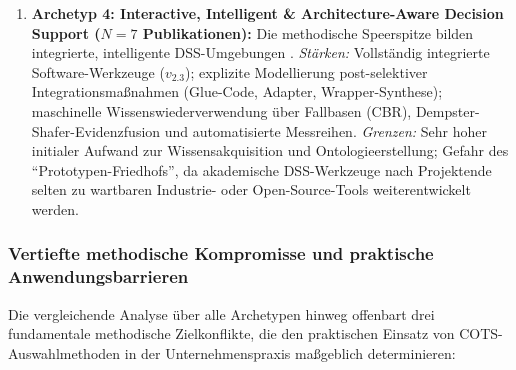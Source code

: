 \begin{enumerate}[label=\textbf{\arabic*.}, leftmargin=*]
  \item \textbf{Archetyp 4: Interactive, Intelligent \& Architecture-Aware Decision Support ($N = 7$ Publikationen):}  
  Die methodische Speerspitze bilden integrierte, intelligente DSS-Umgebungen \parencite[Dazu gehören:][]{QDUNCXFC, 6RNULWVY, 9F79VAAB, 8VHUMEKY, U4E7VXQU, W8P543Y2, LNQHES84}.  
  \textit{Stärken:} Vollständig integrierte Software-Werkzeuge ($v_{2.3}$); explizite Modellierung post-selektiver Integrationsmaßnahmen (Glue-Code, Adapter, Wrapper-Synthese); maschinelle Wissenswiederverwendung über Fallbasen (CBR), Dempster-Shafer-Evidenzfusion und automatisierte Messreihen.  
  \textit{Grenzen:} Sehr hoher initialer Aufwand zur Wissensakquisition und Ontologieerstellung; Gefahr des \enquote{Prototypen-Friedhofs}, da akademische DSS-Werkzeuge nach Projektende selten zu wartbaren Industrie- oder Open-Source-Tools weiterentwickelt werden.
\end{enumerate}

\subsubsection{Vertiefte methodische Kompromisse und praktische Anwendungsbarrieren}
\label{subsubsec:tradeoffs_barrieren}

Die vergleichende Analyse über alle Archetypen hinweg offenbart drei fundamentale methodische Zielkonflikte, die den praktischen Einsatz von COTS-Auswahlmethoden in der Unternehmenspraxis maßgeblich determinieren:

